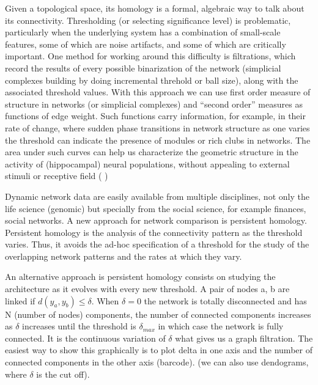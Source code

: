 \documentclass[onecollarge,runningheads]{svjour2}
\begin{document}
Given a topological space, its homology is a formal, algebraic way to talk about its connectivity.
Thresholding (or selecting significance level) is problematic, particularly when the underlying system has a combination of small-scale features, some of which are noise artifacts, and some of which are critically important.  %
One method for working around this difficulty is filtrations, which record the results of every possible binarization of the network (simplicial complexes building by doing incremental threhold or ball size), along with the associated threshold values. With this approach we can use first order measure of structure in networks (or simplicial complexes) and  “second order” measures as functions of edge weight. Such functions carry information, for example, in their rate of change, where sudden phase transitions in network structure as one varies the threshold can indicate the presence of modules or rich clubs in networks. The area under such curves can help us characterize the geometric structure in the activity of (hippocampal) neural populations, without appealing to external stimuli or receptive field ( \cite{giusti2015clique})

Dynamic network data are easily available from multiple disciplines, not only the life science (genomic) but specially from the social science, for example finances, social networks. A new approach for network comparison is persistent homology. Persistent homology is the analysis of the connectivity pattern as the threshold varies. Thus, it avoids the ad-hoc specification of a threshold for the study of the overlapping network patterns and the rates at which they vary.

An alternative approach is persistent homology consists on studying the architecture as it evolves with every new threshold.
A pair of nodes a, b are linked if $d(y_a, y_b) \leq \delta$. When $\delta = 0$ the network is totally disconnected and has N (number of nodes) components, the number of connected components increases as $\delta$ increases until the threshold is $\delta_{max}$ in which case the network is fully connected. It is the continuous variation of $\delta$ what gives us a graph filtration. The easiest way to show this graphically is to plot delta in one axis and the number of connected components in the other axis (barcode). (we can also use dendograms, where $\delta$ is the cut off). 
\end{document}
